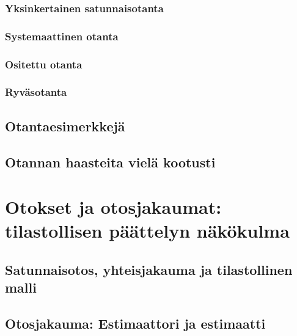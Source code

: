 \documentclass[
]{book}
\begin{document}
\hypertarget{yksinkertainen-satunnaisotanta}{%
\subsection{Yksinkertainen satunnaisotanta}\label{yksinkertainen-satunnaisotanta}}

\hypertarget{systemaattinen-otanta}{%
\subsection{Systemaattinen otanta}\label{systemaattinen-otanta}}

\hypertarget{ositettu-otanta}{%
\subsection{Ositettu otanta}\label{ositettu-otanta}}

\hypertarget{ryvuxe4sotanta}{%
\subsection{Ryväsotanta}\label{ryvuxe4sotanta}}

\hypertarget{alaluku56}{%
\section{Otantaesimerkkejä}\label{alaluku56}}

\hypertarget{alaluku57}{%
\section{Otannan haasteita vielä kootusti}\label{alaluku57}}

\hypertarget{luku6}{%
\chapter{Otokset ja otosjakaumat: tilastollisen päättelyn näkökulma}\label{luku6}}

\hypertarget{alaluku61}{%
\section{Satunnaisotos, yhteisjakauma ja tilastollinen malli}\label{alaluku61}}

\hypertarget{alaluku62}{%
\section{Otosjakauma: Estimaattori ja estimaatti}\label{alaluku62}}
\end{document}
